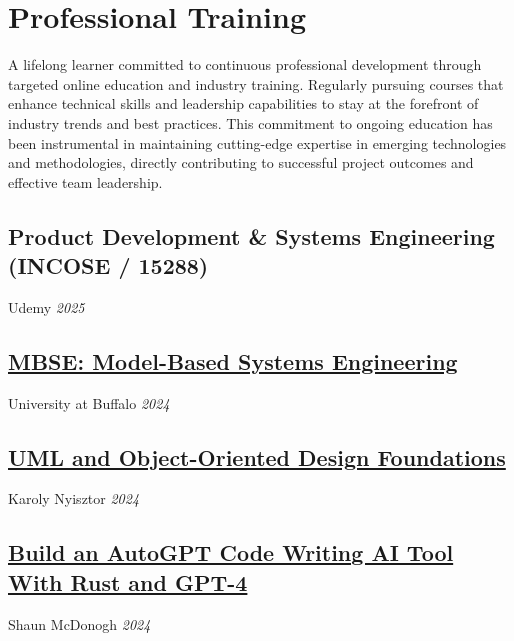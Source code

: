 %
%
%
\section{Professional Training}

A lifelong learner committed to continuous professional development through 
targeted online education and industry training. Regularly pursuing courses 
that enhance technical skills and leadership capabilities to stay at the 
forefront of industry trends and best practices. This commitment to ongoing 
education has been instrumental in maintaining cutting-edge expertise in 
emerging technologies and methodologies, directly contributing to successful 
project outcomes and effective team leadership.\\

%
\subsection{Product Development \& Systems Engineering (INCOSE / 15288)}
Udemy \textit{2025}
\\
\subsection{\href{https://www.coursera.org/account/accomplishments/verify/KQKRA2UXQ87B}{MBSE: Model-Based Systems Engineering}}
University at Buffalo \textit{2024}
\\
\subsection{\href{https://www.udemy.com/certificate/UC-929893e5-ca33-4487-b10f-7bd4af87ef99/}{UML and Object-Oriented
Design Foundations}}
Karoly Nyisztor \textit{2024}
\\\subsection{\href{https://www.udemy.com/certificate/UC-c466d026-b8ad-48f2-85ff-7b2aea9a05ed/}{Build an AutoGPT Code Writing AI Tool With Rust and GPT-4}}
Shaun McDonogh \textit{2024}
\\
